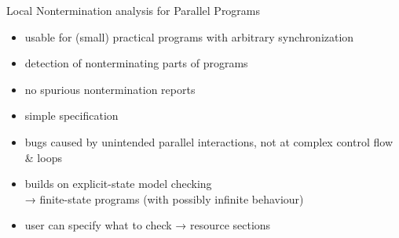 \documentclass[aspectratio=169, fi]{paradise-slide}
\begin{document}
\begin{frame}[fragile]{Local Nontermination analysis for Parallel Programs}
  \setlength{\leftmargini}{1em}
  \begin{itemize}
    \item usable for (small) practical programs with arbitrary synchronization
    \item detection of nonterminating parts of programs
    \item no spurious nontermination reports
    \item simple specification
    \item bugs caused by unintended parallel interactions, not at complex control flow \& loops
  \pause
  \bigskip
    \item builds on explicit-state model checking\\
      → finite-state programs (with possibly infinite behaviour)
    \item user can specify what to check → resource sections
  \end{itemize}

%
\end{frame}
\end{document}
